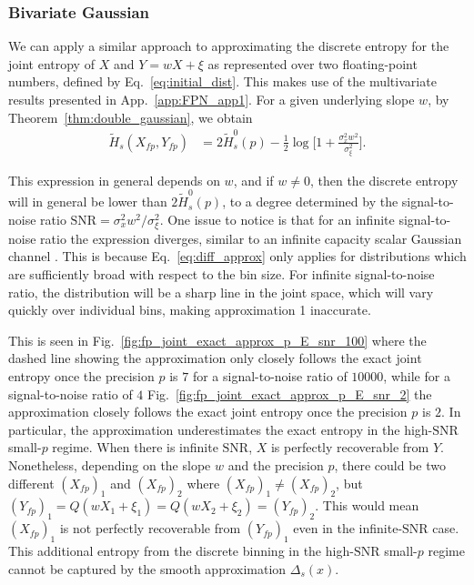 \documentclass[12pt,onecolumn, margin=1in]{IEEEtran}
\newcommand{\Ht}{\tilde{H}}
\newcommand{\Xfp}{X_{fp}}
\newcommand{\Yfp}{Y_{fp}}
\newcommand{\snr}{\mathrm{SNR}}
\begin{document}
\subsubsection{Bivariate Gaussian} 

We can apply a similar approach to approximating the discrete entropy for the joint entropy of $X$ and $Y = wX + \xi$ as represented over two floating-point numbers, defined by Eq.~\eqref{eq:initial_dist}. This makes use of the multivariate results presented in App.~\ref{app:FPN_app1}. For a given underlying slope $w$, by Theorem~\ref{thm:double_gaussian}, we obtain 
\begin{equation}
    \label{eq:approx_joint_ent_SNR}
    \begin{aligned}
        \Ht_s(\Xfp, \Yfp) &= 2\Ht^0_{s}(p) - \frac{1}{2} \log \bigg [1 + \frac{\sigma_x^2 w^2}{\sigma^2_\xi} \bigg ].
    \end{aligned}
\end{equation}

This expression in general depends on $w$, and if $w \neq 0$, then the discrete entropy will in general be lower than $2 \Ht^0_{s}(p)$, to a degree determined by the signal-to-noise ratio $\snr = \sigma_x^2 w^2/\sigma_{\xi}^2$. One issue to notice is that for an infinite signal-to-noise ratio the expression diverges, similar to an infinite capacity scalar Gaussian channel \cite{CoverThomas, shannon_communication_1949}. This is because Eq.~\eqref{eq:diff_approx} only applies for distributions which are sufficiently broad with respect to the bin size. For infinite signal-to-noise ratio, the distribution will be a sharp line in the joint space, which will vary quickly over individual bins, making approximation 1 inaccurate. 

This is seen in Fig.~\ref{fig:fp_joint_exact_approx_p_E_snr_100} where the dashed line showing the approximation only closely follows the exact joint entropy once the precision $p$ is $7$ for a signal-to-noise ratio of $10000$, while for a signal-to-noise ratio of $4$ Fig.~\ref{fig:fp_joint_exact_approx_p_E_snr_2} the approximation closely follows the exact joint entropy once the precision $p$ is $2$. In particular, the approximation underestimates the exact entropy in the high-$\snr$ small-$p$ regime. When there is infinite $\snr$, $X$ is perfectly recoverable from $Y$. Nonetheless, depending on the slope $w$ and the precision $p$, there could be two different $(\Xfp)_1$ and $(\Xfp)_2$ where $(\Xfp)_1 \neq (\Xfp)_2$, but $(\Yfp)_1 = Q(wX_1 + \xi_1) = Q(wX_2 + \xi_2) = (\Yfp)_2$. This would mean $(\Xfp)_1$ is not perfectly recoverable from $(\Yfp)_1$ even in the infinite-$\snr$ case. This additional entropy from the discrete binning in the high-$\snr$ small-$p$ regime cannot be captured by the smooth approximation $\Delta_s(x)$.
\end{document}
